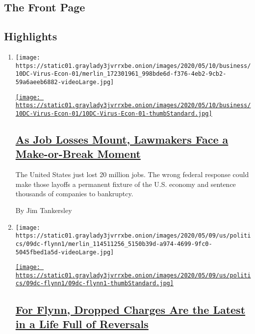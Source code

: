 \hypertarget{the-front-page}{%
\subsection{The Front Page}\label{the-front-page}}

\hypertarget{highlights}{%
\subsection{Highlights}\label{highlights}}

\begin{enumerate}
\def\labelenumi{\arabic{enumi}.}
\item
  \texttt{[image: https://static01.graylady3jvrrxbe.onion/images/2020/05/10/business/10DC-Virus-Econ-01/merlin\_172301961\_998bde6d-f376-4eb2-9cb2-59a6aeeb6882-videoLarge.jpg]}

  \href{/2020/05/09/business/as-job-losses-mount-lawmakers-face-a-make-or-break-moment.html}{\texttt{[image: https://static01.graylady3jvrrxbe.onion/images/2020/05/10/business/10DC-Virus-Econ-01/10DC-Virus-Econ-01-thumbStandard.jpg]}}

  \hypertarget{as-job-losses-mount-lawmakers-face-a-make-or-break-moment}{%
  \subsection{\texorpdfstring{\href{/2020/05/09/business/as-job-losses-mount-lawmakers-face-a-make-or-break-moment.html}{As
  Job Losses Mount, Lawmakers Face a Make-or-Break
  Moment}}{As Job Losses Mount, Lawmakers Face a Make-or-Break Moment}}\label{as-job-losses-mount-lawmakers-face-a-make-or-break-moment}}

  The United States just lost 20 million jobs. The wrong federal
  response could make those layoffs a permanent fixture of the U.S.
  economy and sentence thousands of companies to bankruptcy.

  By Jim Tankersley
\item
  \texttt{[image: https://static01.graylady3jvrrxbe.onion/images/2020/05/09/us/politics/09dc-flynn1/merlin\_114511256\_5150b39d-a974-4699-9fc0-5045fbed1a5d-videoLarge.jpg]}

  \href{/2020/05/09/us/politics/michael-flynn.html}{\texttt{[image: https://static01.graylady3jvrrxbe.onion/images/2020/05/09/us/politics/09dc-flynn1/09dc-flynn1-thumbStandard.jpg]}}

  \hypertarget{for-flynn-dropped-charges-are-the-latest-in-a-life-full-of-reversals}{%
  \subsection{\texorpdfstring{\href{/2020/05/09/us/politics/michael-flynn.html}{For
  Flynn, Dropped Charges Are the Latest in a Life Full of
  Reversals}}{For Flynn, Dropped Charges Are the Latest in a Life Full of Reversals}}\label{for-flynn-dropped-charges-are-the-latest-in-a-life-full-of-reversals}}


\end{enumerate}
